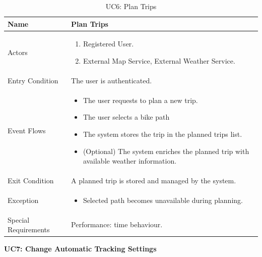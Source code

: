 \begin{table}[H]
    \centering
    \renewcommand{\arraystretch}{1.3}
    \begin{tabular}{|p{}|p{}|}
        \hline
        Name & \textbf{Plan Trips} \\
        \hline
        Actors & \begin{enumerate}[topsep=0pt, partopsep=0pt, leftmargin=*]
            \item Registered User.
            \item External Map Service, External Weather Service.
        \end{enumerate} \\
        \hline
        Entry Condition & The user is authenticated. \\
        \hline
        Event Flows & \begin{itemize}[topsep=0pt, partopsep=0pt, leftmargin=*]
            \item The user requests to plan a new trip.
            \item The user selects a bike path
            \item The system stores the trip in the planned trips list.
            \item (Optional) The system enriches the planned trip with available weather information.
        \end{itemize} \\
        \hline
        Exit Condition & A planned trip is stored and managed by the system. \\
        \hline
        Exception & \begin{itemize}[topsep=0pt, partopsep=0pt, leftmargin=*]
            \item Selected path becomes unavailable during planning.
        \end{itemize} \\
        \hline
        Special Requirements & Performance: time behaviour.\\
        \hline
    \end{tabular}
    \caption{UC6: Plan Trips}
    \label{uc6}
\end{table}

\vspace{12pt}
\noindent
\textbf{UC7: Change Automatic Tracking Settings}

